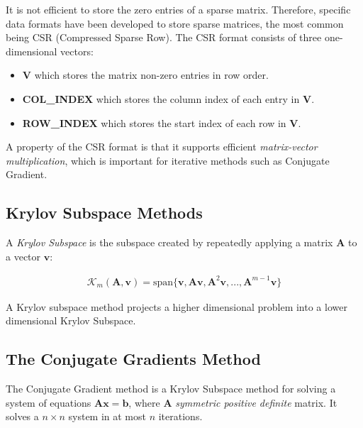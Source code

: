It is not efficient to store the zero entries of a sparse matrix. Therefore, specific data formats have been developed to store sparse matrices, the most common being CSR (Compressed Sparse Row). The CSR format consists of three one-dimensional vectors:

\begin{itemize}
\item \textbf{V} which stores the matrix non-zero entries in row order.
\item \textbf{COL\_INDEX} which stores the column index of each entry in \textbf{V}.
\item \textbf{ROW\_INDEX} which stores the start index of each row in \textbf{V}.
\end{itemize}

A property of the CSR format is that it supports efficient \emph{matrix-vector multiplication}, which is important for iterative methods such as Conjugate Gradient.


%
%
%
\subsection{Krylov Subspace Methods}

A \emph{Krylov Subspace} is the subspace created by repeatedly applying a matrix $\mathbf{A}$ to a vector $\mathbf{v}$:

\begin{align}
\mathcal{K}_m(\mathbf{A}, \mathbf{v}) = \text{span\{}\mathbf{v}, \mathbf{A}\mathbf{v}, \mathbf{A}^2\mathbf{v}, ..., \mathbf{A}^{m-1}\mathbf{v}\text{\}}
\end{align}

A Krylov subspace method projects a higher dimensional problem into a lower dimensional Krylov Subspace.




%
%
\subsection{The Conjugate Gradients Method}

The Conjugate Gradient method is a Krylov Subspace method for solving a system of equations $\mathbf{A}\mathbf{x}=\mathbf{b}$, where $\mathbf{A}$ \emph{symmetric positive definite} matrix. It solves a $n \times n$ system in at most $n$ iterations.

